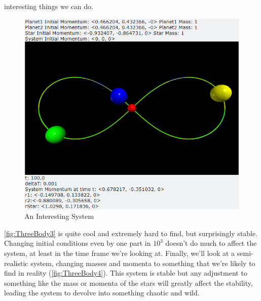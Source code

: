 \documentclass[12pt]{article}
\begin{document}
\begin{enumerate}
        interesting things we can do. 
        \begin{figure}[h]
            \begin{center}
               \includegraphics[scale=.5]{ThreeBody3.png}
               \caption{An Interesting System}
               \label{fig:ThreeBody3}
            \end{center}
        \end{figure}
        \autoref{fig:ThreeBody3} is quite cool and extremely hard to find, but surprisingly stable. 
        Changing initial conditions even by one part in $10^3$ doesn't do much to affect the system, 
        at least in the time frame we're looking at. \newline
        Finally, we'll look at a semi-realistic system, changing masses and momenta to something that 
        we're likely to find in reality (\autoref{fig:ThreeBody4}). This system is stable but any 
        adjustment to something like the mass or momenta of the stars will greatly affect the stability, 
        leading the system to devolve into something chaotic and wild.
        \begin{figure}[H]
            \begin{center}

\end{center}
\end{figure}
\end{enumerate}
\end{document}
